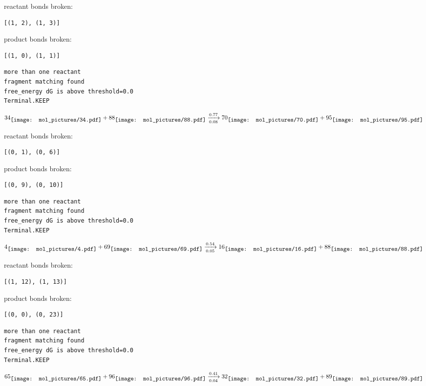 \documentclass{article}
\begin{document}
reactant bonds broken:\begin{verbatim}
[(1, 2), (1, 3)]
\end{verbatim}
product bonds broken:\begin{verbatim}
[(1, 0), (1, 1)]
\end{verbatim}




\vspace{1cm}
\begin{verbatim}
more than one reactant
fragment matching found
free_energy dG is above threshold=0.0
Terminal.KEEP
\end{verbatim}
$$
34
\raisebox{-.5\height}{\texttt{[image: mol\_pictures/34.pdf]}}
+
88
\raisebox{-.5\height}{\texttt{[image: mol\_pictures/88.pdf]}}
\xrightarrow[0.08]{0.77}
70
\raisebox{-.5\height}{\texttt{[image: mol\_pictures/70.pdf]}}
+
95
\raisebox{-.5\height}{\texttt{[image: mol\_pictures/95.pdf]}}
$$


reactant bonds broken:\begin{verbatim}
[(0, 1), (0, 6)]
\end{verbatim}
product bonds broken:\begin{verbatim}
[(0, 9), (0, 10)]
\end{verbatim}




\vspace{1cm}
\begin{verbatim}
more than one reactant
fragment matching found
free_energy dG is above threshold=0.0
Terminal.KEEP
\end{verbatim}
$$
4
\raisebox{-.5\height}{\texttt{[image: mol\_pictures/4.pdf]}}
+
69
\raisebox{-.5\height}{\texttt{[image: mol\_pictures/69.pdf]}}
\xrightarrow[0.05]{0.54}
16
\raisebox{-.5\height}{\texttt{[image: mol\_pictures/16.pdf]}}
+
88
\raisebox{-.5\height}{\texttt{[image: mol\_pictures/88.pdf]}}
$$


reactant bonds broken:\begin{verbatim}
[(1, 12), (1, 13)]
\end{verbatim}
product bonds broken:\begin{verbatim}
[(0, 0), (0, 23)]
\end{verbatim}




\vspace{1cm}
\begin{verbatim}
more than one reactant
fragment matching found
free_energy dG is above threshold=0.0
Terminal.KEEP
\end{verbatim}
$$
65
\raisebox{-.5\height}{\texttt{[image: mol\_pictures/65.pdf]}}
+
96
\raisebox{-.5\height}{\texttt{[image: mol\_pictures/96.pdf]}}
\xrightarrow[0.04]{0.41}
32
\raisebox{-.5\height}{\texttt{[image: mol\_pictures/32.pdf]}}
+
89
\raisebox{-.5\height}{\texttt{[image: mol\_pictures/89.pdf]}}
$$
\end{document}
